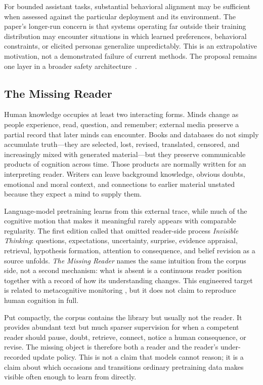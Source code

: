 \documentclass[11pt]{article}
\begin{document}
For bounded assistant tasks, substantial behavioral alignment may be sufficient when assessed against the particular deployment and its environment. The paper's longer-run concern is that systems operating far outside their training distribution may encounter situations in which learned preferences, behavioral constraints, or elicited personas generalize unpredictably. This is an extrapolative motivation, not a demonstrated failure of current methods. The proposal remains one layer in a broader safety architecture~\cite{westerberg2025superintelligence}.

\subsection{The Missing Reader}\label{sec:invisible-thinking}

Human knowledge occupies at least two interacting forms. Minds change as people
experience, read, question, and remember; external media preserve a partial
record that later minds can encounter. Books and databases do not simply
accumulate truth---they are selected, lost, revised, translated, censored, and
increasingly mixed with generated material---but they preserve communicable
products of cognition across time. Those products are normally written for an
interpreting reader. Writers can leave background knowledge, obvious doubts,
emotional and moral context, and connections to earlier material unstated
because they expect a mind to supply them.

Language-model pretraining learns from this external trace, while much of the
cognitive motion that makes it meaningful rarely appears with comparable
regularity. The first edition called that omitted reader-side process
\emph{Invisible Thinking}: questions, expectations, uncertainty, surprise,
evidence appraisal, retrieval, hypothesis formation, attention to consequence,
and belief revision as a source unfolds. \emph{The Missing Reader} names the
same intuition from the corpus side, not a second mechanism: what is absent is a
continuous reader position together with a record of how its understanding
changes. This engineered target is related to metacognitive monitoring
\cite{flavell1979metacognition}, but it does not claim to reproduce human
cognition in full.

Put compactly, the corpus contains the library but usually not the reader. It
provides abundant text but much sparser supervision for when a competent reader
should pause, doubt, retrieve, connect, notice a human consequence, or revise.
The missing object is therefore both a reader and the reader's under-recorded
update policy. This is not a claim that models cannot reason; it is a claim about
which occasions and transitions ordinary pretraining data makes visible often
enough to learn from directly.
\end{document}
